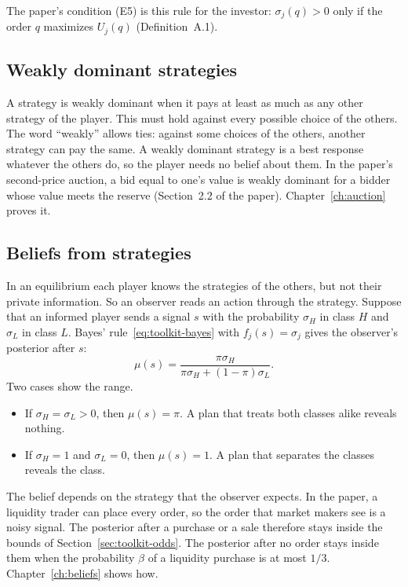 The paper's condition (E5) is this rule for the investor: \(\sigma_j(q)>0\) only if the order \(q\) maximizes
\(U_j(q)\) (Definition~A.1).

\subsection{Weakly dominant strategies}

A strategy is weakly dominant when it pays at least as much as any other strategy of the player. This must hold
against every possible choice of the others. The word ``weakly'' allows ties: against some choices of the others, another
strategy can pay the same. A weakly dominant strategy is a best response whatever the others do, so the player
needs no belief about them. In the paper's second-price auction, a bid equal to one's value is weakly dominant for
a bidder whose value meets the reserve (Section~2.2 of the paper). Chapter~\ref{ch:auction} proves it.

\subsection{Beliefs from strategies}

In an equilibrium each player knows the strategies of the others, but not their private information. So an
observer reads an action through the strategy. Suppose that an informed player sends a signal \(s\) with the
probability \(\sigma_H\) in class \(H\) and \(\sigma_L\) in class \(L\). Bayes' rule~\eqref{eq:toolkit-bayes} with
\(f_j(s)=\sigma_j\) gives the observer's posterior after \(s\):
\[
\mu(s)=\frac{\pi\sigma_H}{\pi\sigma_H+(1-\pi)\sigma_L}.
\]
Two cases show the range.
\begin{itemize}
\item If \(\sigma_H=\sigma_L>0\), then \(\mu(s)=\pi\). A plan that treats both classes alike reveals nothing.
\item If \(\sigma_H=1\) and \(\sigma_L=0\), then \(\mu(s)=1\). A plan that separates the classes reveals the
class.
\end{itemize}
The belief depends on the strategy that the observer expects. In the paper, a liquidity trader can place every
order, so the order that market makers see is a noisy signal. The posterior after a purchase or a sale therefore
stays inside the bounds of Section~\ref{sec:toolkit-odds}. The posterior after no order stays inside them when
the probability \(\beta\) of a liquidity purchase is at most \(1/3\). Chapter~\ref{ch:beliefs} shows how.

